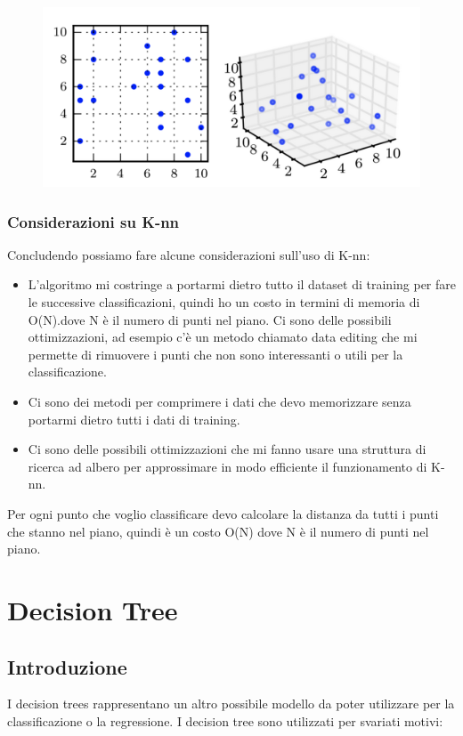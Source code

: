 \documentclass[14pt]{extreport}
\begin{document}
			
\begin{figure}[H] 
	\centering
	\includegraphics[width=0.7\linewidth]{474.jpeg}
	\end{figure}

	\subsection{Considerazioni su K-nn}

	Concludendo possiamo fare alcune considerazioni sull’uso di K-nn:
	\begin{itemize}
		\item L’algoritmo mi costringe a portarmi dietro tutto il dataset di training per fare le successive classificazioni, quindi ho un costo in termini di memoria di O(N).dove N è il numero di punti nel piano.
		Ci sono delle possibili ottimizzazioni, ad esempio c’è un metodo chiamato data editing che mi permette di rimuovere i punti che non sono interessanti o utili per la classificazione.
\item Ci sono dei metodi per comprimere i dati che devo memorizzare senza portarmi dietro tutti i dati di training.
\item Ci sono delle possibili ottimizzazioni che mi fanno usare una struttura di ricerca ad albero per approssimare in modo efficiente il funzionamento di K-nn.
		\end{itemize}Per ogni punto che voglio classificare devo calcolare la distanza da tutti i punti che stanno nel piano, quindi è un costo O(N) dove N è il numero di punti nel piano.


\chapter{Decision Tree}

\section{Introduzione}

I decision trees rappresentano un altro possibile modello da poter utilizzare per la classificazione o la regressione.
I decision tree sono utilizzati per svariati motivi:
\end{document}
